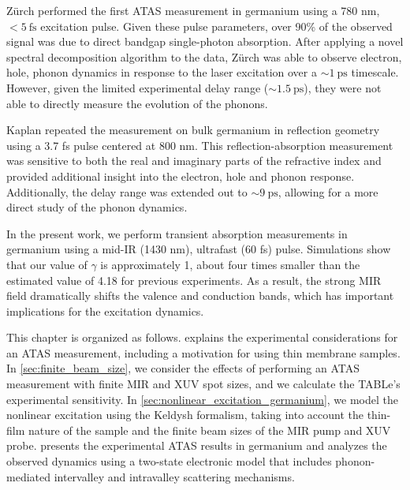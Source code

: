 Z\"{u}rch performed the first ATAS measurement in germanium using a 780 nm, $<5 \ \textrm{fs}$ excitation pulse. Given these pulse parameters, over 90\% of the observed signal was due to direct bandgap single-photon absorption. After applying a novel spectral decomposition algorithm to the data, Z\"{u}rch was able to observe electron, hole, phonon dynamics in response to the laser excitation over a $\sim 1 \ \textrm{ps}$ timescale. However, given the limited experimental delay range ($\sim 1.5 \ \textrm{ps}$), they were not able to directly measure the evolution of the phonons.

Kaplan repeated the measurement on bulk germanium in reflection geometry using a 3.7 fs pulse centered at 800 nm. This reflection-absorption measurement was sensitive to both the real and imaginary parts of the refractive index and provided additional insight into the electron, hole and phonon response. Additionally, the delay range was extended out to $\sim 9 \ \textrm{ps}$, allowing for a more direct study of the phonon dynamics.

In the present work, we perform transient absorption measurements in germanium using a mid-IR (1430 nm), ultrafast (60 fs) pulse. Simulations show that our value of $\gamma$ is approximately 1, about four times smaller than the estimated value of 4.18 for previous experiments. As a result, the strong MIR field dramatically shifts the valence and conduction bands, which has important implications for the excitation dynamics.

This chapter is organized as follows.  explains the experimental considerations for an ATAS measurement, including a motivation for using thin membrane samples. In \cref{sec:finite_beam_size}, we consider the effects of performing an ATAS measurement with finite MIR and XUV spot sizes, and we calculate the TABLe's experimental sensitivity. In \cref{sec:nonlinear_excitation_germanium}, we model the nonlinear excitation using the Keldysh formalism, taking into account the thin-film nature of the sample and the finite beam sizes of the MIR pump and XUV probe.  presents the experimental ATAS results in germanium and analyzes the observed dynamics using a two-state electronic model that includes phonon-mediated intervalley and intravalley scattering mechanisms.

